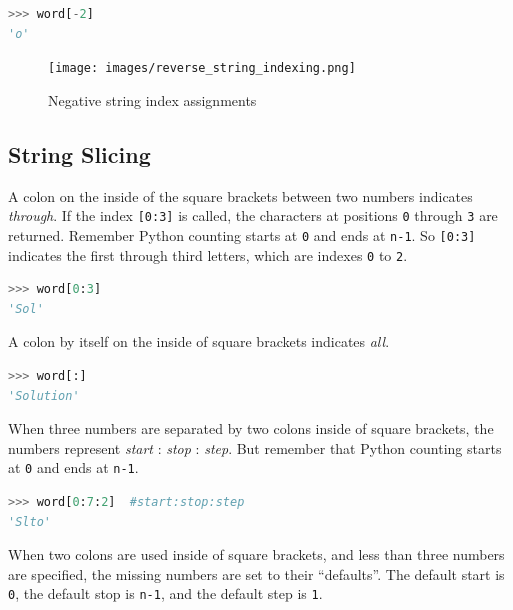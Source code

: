 \documentclass{book}
\begin{document}
\begin{lstlisting}[language=Python]
>>> word[-2]
'o'
\end{lstlisting}

\begin{figure}
\centering
\texttt{[image: images/reverse\_string\_indexing.png]}
\caption{Negative string index assignments}
\end{figure}
    




    
        \subsection{String Slicing}\label{string-slicing}

A colon on the inside of the square brackets between two numbers
indicates \emph{through}. If the index \lstinline![0:3]! is called, the
characters at positions \lstinline!0! through \lstinline!3! are
returned. Remember Python counting starts at \lstinline!0! and ends at
\lstinline!n-1!. So \lstinline![0:3]! indicates the first through third
letters, which are indexes \lstinline!0! to \lstinline!2!.

\begin{lstlisting}[language=Python]
>>> word[0:3]
'Sol'
\end{lstlisting}
    




    
        A colon by itself on the inside of square brackets indicates \emph{all}.

\begin{lstlisting}[language=Python]
>>> word[:]
'Solution'
\end{lstlisting}
    




    
        When three numbers are separated by two colons inside of square
brackets, the numbers represent \emph{start} : \emph{stop} :
\emph{step}. But remember that Python counting starts at \lstinline!0!
and ends at \lstinline!n-1!.

\begin{lstlisting}[language=Python]
>>> word[0:7:2]  #start:stop:step
'Slto'
\end{lstlisting}
    




    
        When two colons are used inside of square brackets, and less than three
numbers are specified, the missing numbers are set to their
``defaults''. The default start is \lstinline!0!, the default stop is
\lstinline!n-1!, and the default step is \lstinline!1!.
\end{document}
